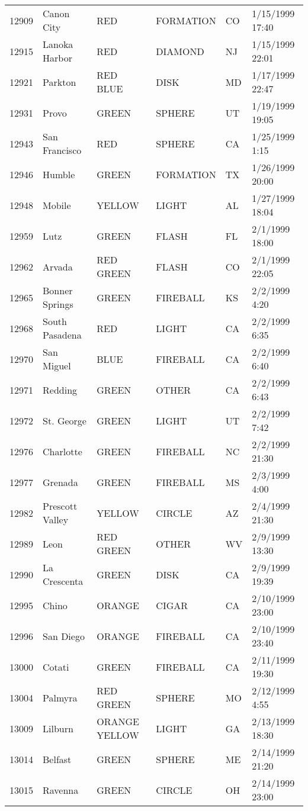 \begin{tabular}{llllll}
12909 & Canon City & RED & FORMATION & CO & 1/15/1999 17:40 \\
12915 & Lanoka Harbor & RED & DIAMOND & NJ & 1/15/1999 22:01 \\
12921 & Parkton & RED BLUE & DISK & MD & 1/17/1999 22:47 \\
12931 & Provo & GREEN & SPHERE & UT & 1/19/1999 19:05 \\
12943 & San Francisco & RED & SPHERE & CA & 1/25/1999 1:15 \\
12946 & Humble & GREEN & FORMATION & TX & 1/26/1999 20:00 \\
12948 & Mobile & YELLOW & LIGHT & AL & 1/27/1999 18:04 \\
12959 & Lutz & GREEN & FLASH & FL & 2/1/1999 18:00 \\
12962 & Arvada & RED GREEN & FLASH & CO & 2/1/1999 22:05 \\
12965 & Bonner Springs & GREEN & FIREBALL & KS & 2/2/1999 4:20 \\
12968 & South Pasadena & RED & LIGHT & CA & 2/2/1999 6:35 \\
12970 & San Miguel & BLUE & FIREBALL & CA & 2/2/1999 6:40 \\
12971 & Redding & GREEN & OTHER & CA & 2/2/1999 6:43 \\
12972 & St. George & GREEN & LIGHT & UT & 2/2/1999 7:42 \\
12976 & Charlotte & GREEN & FIREBALL & NC & 2/2/1999 21:30 \\
12977 & Grenada & GREEN & FIREBALL & MS & 2/3/1999 4:00 \\
12982 & Prescott Valley & YELLOW & CIRCLE & AZ & 2/4/1999 21:30 \\
12989 & Leon & RED GREEN & OTHER & WV & 2/9/1999 13:30 \\
12990 & La Crescenta & GREEN & DISK & CA & 2/9/1999 19:39 \\
12995 & Chino & ORANGE & CIGAR & CA & 2/10/1999 23:00 \\
12996 & San Diego & ORANGE & FIREBALL & CA & 2/10/1999 23:40 \\
13000 & Cotati & GREEN & FIREBALL & CA & 2/11/1999 19:30 \\
13004 & Palmyra & RED GREEN & SPHERE & MO & 2/12/1999 4:55 \\
13009 & Lilburn & ORANGE YELLOW & LIGHT & GA & 2/13/1999 18:30 \\
13014 & Belfast & GREEN & SPHERE & ME & 2/14/1999 21:20 \\
13015 & Ravenna & GREEN & CIRCLE & OH & 2/14/1999 23:00 \\

\end{tabular}
